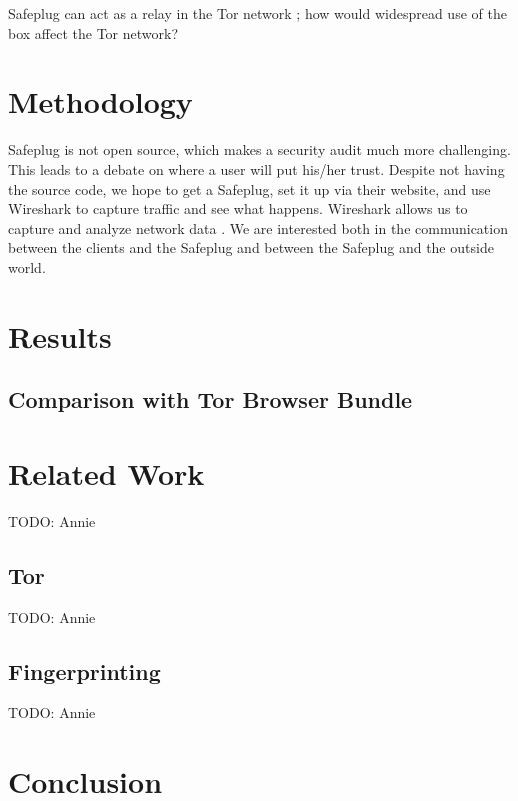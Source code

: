 \documentclass[12pt, letterpaper]{article}
\begin{document}
Safeplug can act as a relay in the Tor network \cite{techreview}; how would widespread use of the box affect the Tor network?

\section{Methodology}
Safeplug is not open source, which makes a security audit much more challenging.  This leads to a debate on where a user will put his/her trust.  Despite not having the source code, we hope to get a Safeplug, set it up via their website, and use Wireshark to capture traffic and see what happens.  Wireshark allows us to capture and analyze network data \cite{wireshark}.  We are interested both in the communication between the clients and the Safeplug and between the Safeplug and the outside world.  

\section{Results}

\subsection{Comparison with Tor Browser Bundle}

\section{Related Work}
TODO: Annie

\subsection{Tor}
TODO: Annie

\subsection{Fingerprinting}
TODO: Annie

\section{Conclusion}


\end{document}
